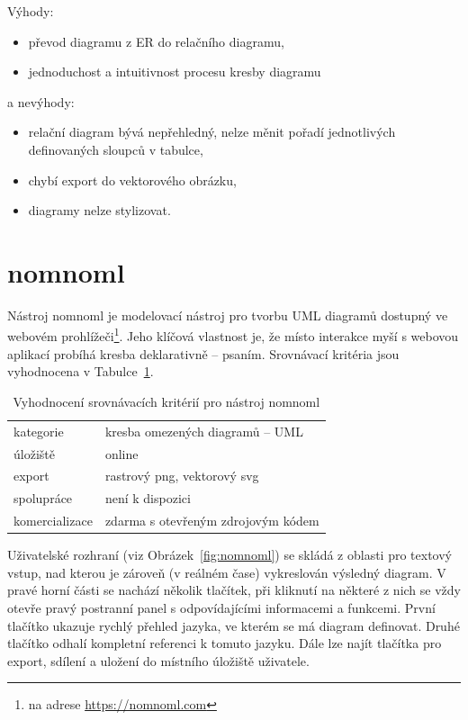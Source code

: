 Výhody:
\begin{itemize}
  \item převod diagramu z ER do relačního diagramu,
  \item jednoduchost a intuitivnost procesu kresby diagramu
\end{itemize}
a nevýhody:
\begin{itemize}
  \item relační diagram bývá nepřehledný, nelze měnit pořadí jednotlivých definovaných sloupců v tabulce,
  \item chybí export do vektorového obrázku,
  \item diagramy nelze stylizovat.
\end{itemize}

\section{nomnoml}

Nástroj nomnoml je modelovací nástroj pro tvorbu UML diagramů dostupný ve webovém prohlížeči\footnote{na adrese \url{https://nomnoml.com}}.
Jeho klíčová vlastnost je, že místo interakce myší s webovou aplikací probíhá kresba deklarativně -- psaním.
Srovnávací kritéria jsou vyhodnocena v Tabulce~\ref{tab:comparison-nomnoml}.

\begin{table}[!htb]
  \begin{tabularx}{\textwidth}{lX}\toprule
    kategorie      & kresba omezených diagramů -- UML                  \\
    úložiště       & online                                            \\
    export         & rastrový \acrshort{png}, vektorový \acrshort{svg} \\
    spolupráce     & není k dispozici                                  \\
    komercializace & zdarma s otevřeným zdrojovým kódem
    \\\bottomrule
  \end{tabularx}
  \caption{Vyhodnocení srovnávacích kritérií pro nástroj nomnoml}
  \label{tab:comparison-nomnoml}
\end{table}

Uživatelské rozhraní (viz Obrázek~\ref{fig:nomnoml}) se skládá z oblasti pro textový vstup, nad kterou je zároveň (v reálném čase) vykreslován výsledný diagram.
V pravé horní části se nachází několik tlačítek, při kliknutí na některé z nich se vždy otevře pravý postranní panel s odpovídajícími informacemi a funkcemi.
První tlačítko ukazuje rychlý přehled jazyka, ve kterém se má diagram definovat.
Druhé tlačítko odhalí kompletní referenci k tomuto jazyku.
Dále lze najít tlačítka pro export, sdílení a uložení do místního úložiště uživatele.

